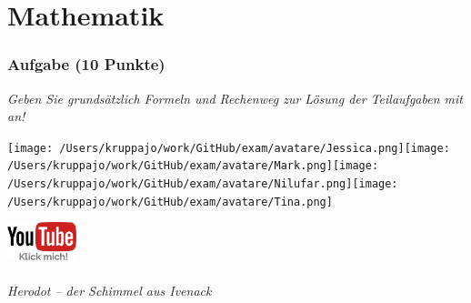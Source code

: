 \documentclass[a4paper, 9pt]{scrartcl}\usepackage[]{graphicx}\usepackage[]{xcolor}
\begin{document}
 
\clearpage
\part{Mathematik}

\section{Aufgabe \hfill (10 Punkte)}

\textit{Geben Sie grundsätzlich Formeln und Rechenweg zur Lösung der Teilaufgaben mit an!} \\[1Ex]
 

 
\ifcollection
\begin{flushright}
\tiny\vspace{-3Ex}
\textbf{\examinhaltstart}
\exammodulemathstat
\vspace{-4Ex}
\end{flushright}
\begin{minipage}[t]{0.5\textwidth}
\texttt{[image: /Users/kruppajo/work/GitHub/exam/avatare/Jessica.png]}\hspace{-4mm}\texttt{[image: /Users/kruppajo/work/GitHub/exam/avatare/Mark.png]}\hspace{-4mm}\texttt{[image: /Users/kruppajo/work/GitHub/exam/avatare/Nilufar.png]}\hspace{-4mm}\texttt{[image: /Users/kruppajo/work/GitHub/exam/avatare/Tina.png]}
\end{minipage}
\begin{minipage}[t]{0.5\textwidth}
\hfill
\href{https://youtu.be/Fu8kN0Uj13Y}{\includegraphics[width = 2cm]{img/youtube}}
\end{minipage}
\fi



\ifcollection
\paragraph{Herodot – der Schimmel aus Ivenack}
\fi
\end{document}
